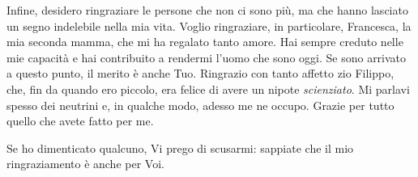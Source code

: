 Infine, desidero ringraziare le persone che non ci sono più, ma che hanno lasciato un segno indelebile nella mia vita.
Voglio ringraziare, in particolare, Francesca, la mia seconda mamma, che mi ha regalato tanto amore.
Hai sempre creduto nelle mie capacità e hai contribuito a rendermi l'uomo che sono oggi.
Se sono arrivato a questo punto, il merito è anche Tuo.
Ringrazio con tanto affetto zio Filippo, che, fin da quando ero piccolo, era felice di avere un nipote \emph{scienziato}.
Mi parlavi spesso dei neutrini e, in qualche modo, adesso me ne occupo.
Grazie per tutto quello che avete fatto per me.



Se ho dimenticato qualcuno, Vi prego di scusarmi: sappiate che il mio ringraziamento è anche per Voi.







